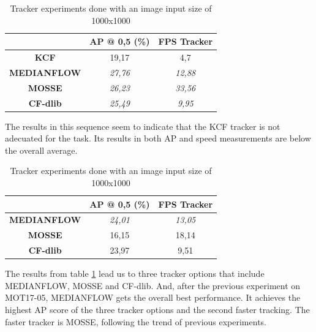 \begin{table}[H]
\scriptsize
\begin{center}
\begin{tabular}{|c|c|c|}
\hline
\textbf{}           & \textbf{AP @ 0,5 (\%)} & \textbf{FPS Tracker} \\ \hline
\textbf{KCF}        & 19,17                  & 4,7                  \\ \hline
\textbf{MEDIANFLOW} & \textit{27,76}         & \textit{12,88}       \\ \hline
\textbf{MOSSE}      & \textit{26,23}         & \textit{33,56}       \\ \hline
\textbf{CF-dlib}    & \textit{25,49}         & \textit{9,95}        \\ \hline
\end{tabular}
\end{center}
\caption{Tracker experiments done with an image input size of 1000x1000}
\label{tab:tracker_exp_2}
\end{table}
The results in this sequence seem to indicate that the KCF tracker is not adecuated for the task. Its results in both AP and speed measurements are below the overall average.
\begin{table}[H]
\scriptsize
\begin{center}
\begin{tabular}{|c|c|c|}
\hline
\textbf{}           & \textbf{AP @ 0,5 (\%)} & \textbf{FPS Tracker} \\ \hline
\textbf{MEDIANFLOW} & \textit{24,01}         & \textit{13,05}       \\ \hline
\textbf{MOSSE}      & 16,15                  & 18,14               \\ \hline
\textbf{CF-dlib}    & 23,97                  & 9,51                 \\ \hline
\end{tabular}
\end{center}
\caption{Tracker experiments done with an image input size of 1000x1000}
\label{tab:tracker_exp_3}
\end{table}
The results from table \ref{tab:tracker_exp_2} lead us to three tracker options that include MEDIANFLOW, MOSSE and CF-dlib. And, after the previous experiment on MOT17-05, MEDIANFLOW gets the overall best performance. It achieves the highest AP score of the three tracker options and the second faster tracking. The faster tracker is MOSSE, following the trend of previous experiments.
